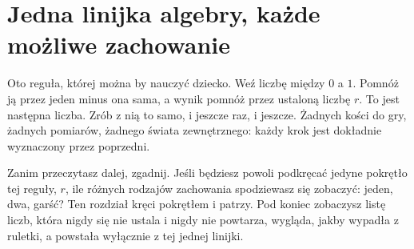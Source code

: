 
\chapter{Jedna linijka algebry, każde możliwe zachowanie}
\label{ch:logistic}

\noindent
Oto reguła, której można by nauczyć dziecko. Weź liczbę między $0$ a $1$.
Pomnóż ją przez jeden minus ona sama, a wynik pomnóż przez ustaloną liczbę
$r$. To jest następna liczba. Zrób z nią to samo, i jeszcze raz, i jeszcze.
Żadnych kości do gry, żadnych pomiarów, żadnego świata zewnętrznego: każdy
krok jest dokładnie wyznaczony przez poprzedni.

Zanim przeczytasz dalej, zgadnij. Jeśli będziesz powoli podkręcać jedyne
pokrętło tej reguły, $r$, ile różnych rodzajów zachowania spodziewasz się
zobaczyć: jeden, dwa, garść? Ten rozdział kręci pokrętłem i patrzy. Pod
koniec zobaczysz listę liczb, która nigdy się nie ustala i nigdy nie
powtarza, wygląda, jakby wypadła z ruletki, a powstała wyłącznie z tej
jednej linijki.

\begin{outcomes}
\end{outcomes}

